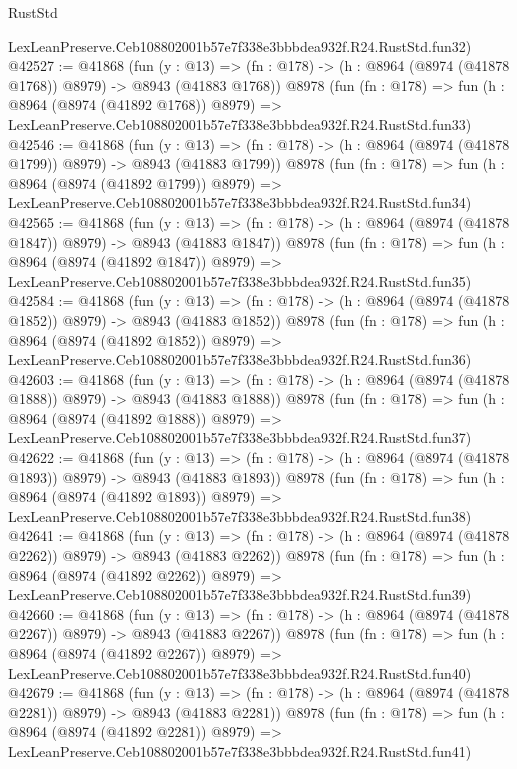 \begin{lexlean}{RustStd}
\begin{coremodule}
    LexLeanPreserve.Ceb108802001b57e7f338e3bbbdea932f.R24.RustStd.fun32)
@42527 := @41868
    (fun (y : @13) =>
    (fn : @178) -> (h : @8964 (@8974 (@41878 @1768)) @8979) -> @8943 (@41883 @1768))
    @8978
    (fun (fn : @178) =>
    fun (h : @8964 (@8974 (@41892 @1768)) @8979) =>
    LexLeanPreserve.Ceb108802001b57e7f338e3bbbdea932f.R24.RustStd.fun33)
@42546 := @41868
    (fun (y : @13) =>
    (fn : @178) -> (h : @8964 (@8974 (@41878 @1799)) @8979) -> @8943 (@41883 @1799))
    @8978
    (fun (fn : @178) =>
    fun (h : @8964 (@8974 (@41892 @1799)) @8979) =>
    LexLeanPreserve.Ceb108802001b57e7f338e3bbbdea932f.R24.RustStd.fun34)
@42565 := @41868
    (fun (y : @13) =>
    (fn : @178) -> (h : @8964 (@8974 (@41878 @1847)) @8979) -> @8943 (@41883 @1847))
    @8978
    (fun (fn : @178) =>
    fun (h : @8964 (@8974 (@41892 @1847)) @8979) =>
    LexLeanPreserve.Ceb108802001b57e7f338e3bbbdea932f.R24.RustStd.fun35)
@42584 := @41868
    (fun (y : @13) =>
    (fn : @178) -> (h : @8964 (@8974 (@41878 @1852)) @8979) -> @8943 (@41883 @1852))
    @8978
    (fun (fn : @178) =>
    fun (h : @8964 (@8974 (@41892 @1852)) @8979) =>
    LexLeanPreserve.Ceb108802001b57e7f338e3bbbdea932f.R24.RustStd.fun36)
@42603 := @41868
    (fun (y : @13) =>
    (fn : @178) -> (h : @8964 (@8974 (@41878 @1888)) @8979) -> @8943 (@41883 @1888))
    @8978
    (fun (fn : @178) =>
    fun (h : @8964 (@8974 (@41892 @1888)) @8979) =>
    LexLeanPreserve.Ceb108802001b57e7f338e3bbbdea932f.R24.RustStd.fun37)
@42622 := @41868
    (fun (y : @13) =>
    (fn : @178) -> (h : @8964 (@8974 (@41878 @1893)) @8979) -> @8943 (@41883 @1893))
    @8978
    (fun (fn : @178) =>
    fun (h : @8964 (@8974 (@41892 @1893)) @8979) =>
    LexLeanPreserve.Ceb108802001b57e7f338e3bbbdea932f.R24.RustStd.fun38)
@42641 := @41868
    (fun (y : @13) =>
    (fn : @178) -> (h : @8964 (@8974 (@41878 @2262)) @8979) -> @8943 (@41883 @2262))
    @8978
    (fun (fn : @178) =>
    fun (h : @8964 (@8974 (@41892 @2262)) @8979) =>
    LexLeanPreserve.Ceb108802001b57e7f338e3bbbdea932f.R24.RustStd.fun39)
@42660 := @41868
    (fun (y : @13) =>
    (fn : @178) -> (h : @8964 (@8974 (@41878 @2267)) @8979) -> @8943 (@41883 @2267))
    @8978
    (fun (fn : @178) =>
    fun (h : @8964 (@8974 (@41892 @2267)) @8979) =>
    LexLeanPreserve.Ceb108802001b57e7f338e3bbbdea932f.R24.RustStd.fun40)
@42679 := @41868
    (fun (y : @13) =>
    (fn : @178) -> (h : @8964 (@8974 (@41878 @2281)) @8979) -> @8943 (@41883 @2281))
    @8978
    (fun (fn : @178) =>
    fun (h : @8964 (@8974 (@41892 @2281)) @8979) =>
    LexLeanPreserve.Ceb108802001b57e7f338e3bbbdea932f.R24.RustStd.fun41)

\end{coremodule}
\end{lexlean}
